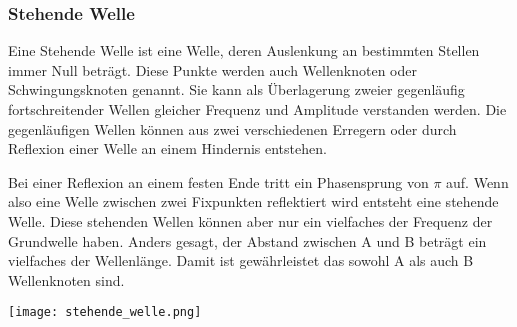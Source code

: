 \documentclass[../document.tex]{subfiles}
\begin{document}
\subsubsection{Stehende Welle}

Eine Stehende Welle ist eine Welle, deren Auslenkung an bestimmten Stellen immer Null beträgt. Diese Punkte werden auch Wellenknoten oder Schwingungsknoten genannt. Sie kann als Überlagerung zweier gegenläufig fortschreitender Wellen gleicher Frequenz und Amplitude verstanden werden. Die gegenläufigen Wellen können aus zwei verschiedenen Erregern oder durch Reflexion einer Welle an einem Hindernis entstehen. 

Bei einer Reflexion an einem festen Ende tritt ein Phasensprung von $\pi$ auf. Wenn also eine Welle zwischen zwei Fixpunkten reflektiert wird entsteht eine stehende Welle. Diese stehenden Wellen können aber nur ein vielfaches der Frequenz der Grundwelle haben. Anders gesagt, der Abstand zwischen A und B beträgt ein vielfaches der Wellenlänge. Damit ist gewährleistet das sowohl A als auch B Wellenknoten sind.

\texttt{[image: stehende\_welle.png]}
\end{document}
